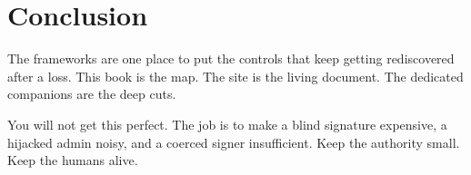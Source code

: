\chapter{Conclusion}

The frameworks are one place to put the controls that
keep getting rediscovered after a loss. This book is
the map. The site is the living document. The dedicated
companions are the deep cuts.

You will not get this perfect. The job is to make a
blind signature expensive, a hijacked admin noisy, and
a coerced signer insufficient. Keep the authority small.
Keep the humans alive.

